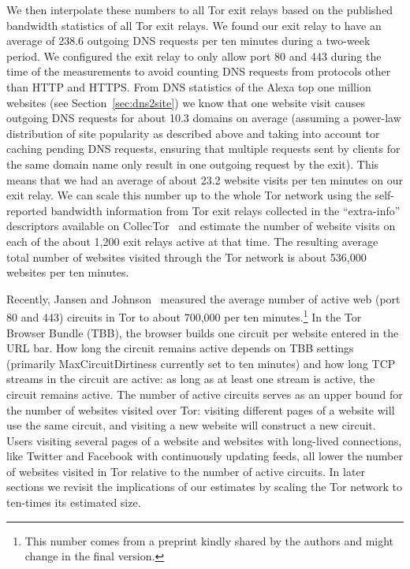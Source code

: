 We then interpolate these numbers to all Tor exit relays based on the published
bandwidth statistics of all Tor exit relays. We found our exit relay to have an
average of 238.6 outgoing DNS requests per ten minutes during a two-week period.
We configured the exit relay to only allow port 80 and 443 during the time
of the measurements to avoid counting DNS requests from protocols other than
HTTP and HTTPS. %
From DNS statistics of the Alexa top one million websites (see
Section~\ref{sec:dns2site}) we know that one website visit causes outgoing DNS requests for about 10.3 domains on average
(assuming a power-law distribution of site popularity as described above and
taking into account tor caching pending DNS requests, ensuring that multiple
requests sent by clients for the same domain name only result in one outgoing request
by the exit).
This means that we had an average of about 23.2 website visits per ten
minutes on our exit relay. We can scale this number up to the whole Tor
network using the self-reported bandwidth information from Tor exit
relays collected in the ``extra-info'' descriptors available on
CollecTor~\cite{collector} and estimate the number of website visits on
each of the about 1,200 exit relays active at that time. The resulting average
total number of websites visited through the Tor network is about 536,000
websites per ten minutes.

Recently, Jansen and Johnson~\cite{jansen-ccs2016} measured the average
number of active web (port 80 and 443) circuits in Tor to about 700,000 per ten 
minutes.\footnote{This number comes from a preprint kindly
shared by the authors and might change in the final version.}
In the Tor Browser Bundle (TBB), the browser builds one circuit per
website entered in the URL bar. How long the circuit remains active depends on
TBB settings (primarily MaxCircuitDirtiness currently set to ten minutes) and how
long TCP streams in the circuit are active: as long as at least one stream is
active, the circuit remains active. The number of active circuits serves as an
upper bound for the number of websites visited over Tor: visiting different
pages of a website will use the same circuit, and visiting a new website will
construct a new circuit. Users visiting several pages of a website and websites
with long-lived connections, like Twitter and Facebook with continuously
updating feeds,
all lower the number of websites visited in Tor relative to the number of active
circuits. In later sections we revisit the implications of our estimates by
scaling the Tor network to ten-times its estimated size.

